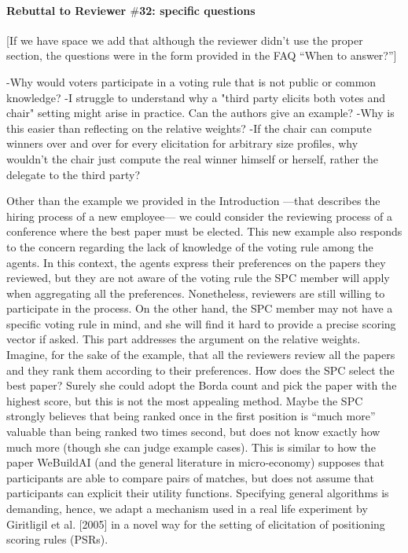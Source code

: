 \documentclass{article}
\begin{document}
\paragraph{Rebuttal to Reviewer $\#$32: specific questions}
[If we have space we add that although the reviewer didn’t use the proper section, the questions were in the form provided in the FAQ “When to answer?”]

-Why would voters participate in a voting rule that is not public or common knowledge?
-I struggle to understand why a "third party elicits both votes and chair" setting might arise in practice. Can the authors give an example?
-Why is this easier than reflecting on the relative weights?
-If the chair can compute winners over and over for every elicitation for arbitrary size profiles, why wouldn't the chair just compute the real winner himself or herself, rather the delegate to the third party?

Other than the example we provided in the Introduction —that describes the hiring process of a new employee— we could consider the reviewing process of a conference where the best paper must be elected. This new example also responds to the concern regarding the lack of knowledge of the voting rule among the agents. In this context, the agents express their preferences on the papers they reviewed, but they are not aware of the voting rule the SPC member will apply when aggregating all the preferences. Nonetheless, reviewers are still willing to participate in the process. On the other hand, the SPC member may not have a specific voting rule in mind, and she will find it hard to provide a precise scoring vector if asked. This part addresses the argument on the relative weights. Imagine, for the sake of the example, that all the reviewers review all the papers and they rank them according to their preferences. How does the SPC select the best paper? Surely she could adopt the Borda count and pick the paper with the highest score, but this is not the most appealing method. Maybe the SPC strongly believes that being ranked once in the first position is “much more” valuable than being ranked two times second, but does not know exactly how much more (though she can judge example cases). This is similar to how the paper WeBuildAI (and the general literature in micro-economy) supposes that participants are able to compare pairs of matches, but does not assume that participants can explicit their utility functions. Specifying general algorithms is demanding, hence, we adapt a mechanism used in a real life experiment by Giritligil et al. [2005] in a novel way for the setting of elicitation of positioning scoring rules (PSRs). 
\end{document}

